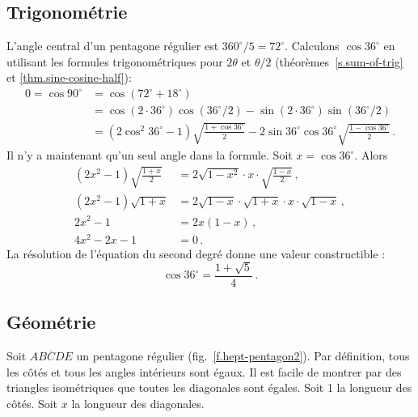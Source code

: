 \subsection{Trigonométrie}
L'angle central d'un pentagone régulier est  $360^\circ/5=72^\circ$. Calculons $\cos 36^\circ$ en utilisant les formules trigonométriques pour $2\theta$ et $\theta/2$  (théorèmes~\ref{s.sum-of-trig} et \ref{thm.sine-cosine-half}):
\begin{align*}
0=\cos 90^\circ &= \cos(72^\circ+18^\circ)\\
&=\cos (2\cdot 36^\circ)\cos (36^\circ/2) - \sin (2\cdot 36^\circ)\sin (36^\circ/2)\\
&=(2\cos^2 36^\circ-1)\sqrt{\frac{1+\cos 36^\circ}{2}}-2\sin 36^\circ\cos 36^\circ\sqrt{\frac{1-\cos 36^\circ}{2}}\,.
\end{align*}
Il n'y a maintenant qu'un seul angle dans la formule. Soit $x=\cos 36^\circ$. Alors 
\begin{align*}
(2x^2-1)\sqrt{\frac{1+x}{2}}&=2\sqrt{1-x^2}\cdot x \cdot \sqrt{\frac{1-x}{2}}\,,\\
(2x^2-1)\sqrt{1+x}&=2\sqrt{1-x}\cdot\sqrt{1+x}\cdot x \cdot \sqrt{1-x}\,,\\
2x^2-1&=2x(1-x)\,,\\
4x^2-2x-1&=0\,.
\end{align*}
La résolution de l'équation du second degré donne une valeur constructible :
\[
\cos 36^\circ = \frac{1+\sqrt{5}}{4}\,.
\]

\subsection{Géométrie}\label{s.geometry-pentagon}

Soit $\overline{ABCDE}$ un pentagone régulier (fig.~\ref{f.hept-pentagon2}). Par définition, tous les côtés et tous les angles intérieurs sont égaux. Il est facile de montrer par des triangles isométriques que toutes les diagonales sont égales. Soit 1 la longueur des côtés. Soit $x$ la longueur des diagonales.


